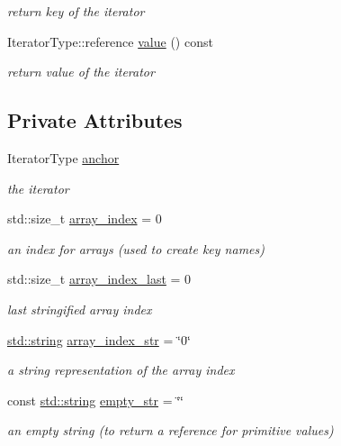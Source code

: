 \begin{DoxyCompactItemize}
\begin{DoxyCompactList}\small\item\em return key of the iterator \end{DoxyCompactList}\item 
Iterator\+Type\+::reference \hyperlink{classnlohmann_1_1detail_1_1iteration__proxy__value_ab8e33bd01c285a1a80b737a1905ceb97}{value} () const
\begin{DoxyCompactList}\small\item\em return value of the iterator \end{DoxyCompactList}\end{DoxyCompactItemize}
\subsection*{Private Attributes}
\begin{DoxyCompactItemize}
\item 
Iterator\+Type \hyperlink{classnlohmann_1_1detail_1_1iteration__proxy__value_a073741b6536b7a5166467a5515bc59cb}{anchor}
\begin{DoxyCompactList}\small\item\em the iterator \end{DoxyCompactList}\item 
std\+::size\+\_\+t \hyperlink{classnlohmann_1_1detail_1_1iteration__proxy__value_ad3d18c83aff5e9f4bdbf99385b29a39a}{array\+\_\+index} = 0
\begin{DoxyCompactList}\small\item\em an index for arrays (used to create key names) \end{DoxyCompactList}\item 
std\+::size\+\_\+t \hyperlink{classnlohmann_1_1detail_1_1iteration__proxy__value_aac6e7cc0c17242a0a42c14d1e714747c}{array\+\_\+index\+\_\+last} = 0
\begin{DoxyCompactList}\small\item\em last stringified array index \end{DoxyCompactList}\item 
\hyperlink{namespacenlohmann_1_1detail_a1ed8fc6239da25abcaf681d30ace4985ab45cffe084dd3d20d928bee85e7b0f21}{std\+::string} \hyperlink{classnlohmann_1_1detail_1_1iteration__proxy__value_a434324f7bed312c5b4aaedd3c6664e28}{array\+\_\+index\+\_\+str} = \char`\"{}0\char`\"{}
\begin{DoxyCompactList}\small\item\em a string representation of the array index \end{DoxyCompactList}\item 
const \hyperlink{namespacenlohmann_1_1detail_a1ed8fc6239da25abcaf681d30ace4985ab45cffe084dd3d20d928bee85e7b0f21}{std\+::string} \hyperlink{classnlohmann_1_1detail_1_1iteration__proxy__value_af970916a35c40e75e2317a6a08370324}{empty\+\_\+str} = \char`\"{}\char`\"{}
\begin{DoxyCompactList}\small\item\em an empty string (to return a reference for primitive values) \end{DoxyCompactList}\end{DoxyCompactItemize}


